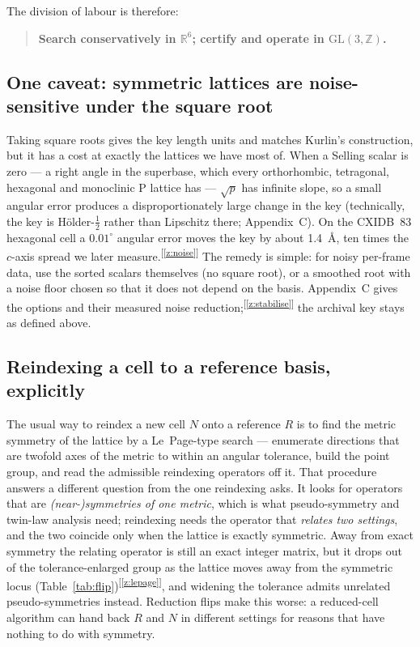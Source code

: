 \documentclass[11pt]{article}
\newcommand{\chk}[1]{\textsuperscript{[\ref{#1}]}}
\begin{document}
The division of labour is therefore:
\begin{quote}
\textbf{Search conservatively in $\mathbb R^6$; certify and operate in $\mathrm{GL}(3,\mathbb Z)$.}
\end{quote}

\subsection{One caveat: symmetric lattices are noise-sensitive under the square root}

Taking square roots gives the key length units and matches Kurlin's construction, but it has a cost at exactly the lattices we have most of. When a Selling scalar is zero --- a right angle in the superbase, which every orthorhombic, tetragonal, hexagonal and monoclinic P lattice has --- $\sqrt{p}$ has infinite slope, so a small angular error produces a disproportionately large change in the key (technically, the key is H\"older-$\tfrac12$ rather than Lipschitz there; Appendix~C). On the CXIDB~83 hexagonal cell a $0.01^\circ$ angular error moves the key by about \SI{1.4}{\angstrom}, ten times the $c$-axis spread we later measure.\chk{z:noise} The remedy is simple: for noisy per-frame data, use the sorted scalars themselves (no square root), or a smoothed root with a noise floor chosen so that it does not depend on the basis. Appendix~C gives the options and their measured noise reduction;\chk{z:stabilise} the archival key stays as defined above.

\subsection{Reindexing a cell to a reference basis, explicitly}
\label{sec:reindex-proc}

The usual way to reindex a new cell $N$ onto a reference $R$ is to find the metric symmetry of the lattice by a Le~Page-type search --- enumerate directions that are twofold axes of the metric to within an angular tolerance, build the point group, and read the admissible reindexing operators off it. That procedure answers a different question from the one reindexing asks. It looks for operators that are \emph{(near-)symmetries of one metric}, which is what pseudo-symmetry and twin-law analysis need; reindexing needs the operator that \emph{relates two settings}, and the two coincide only when the lattice is exactly symmetric. Away from exact symmetry the relating operator is still an exact integer matrix, but it drops out of the tolerance-enlarged group as the lattice moves away from the symmetric locus (Table~\ref{tab:flip})\chk{z:lepage}, and widening the tolerance admits unrelated pseudo-symmetries instead. Reduction flips make this worse: a reduced-cell algorithm can hand back $R$ and $N$ in different settings for reasons that have nothing to do with symmetry.
\end{document}

